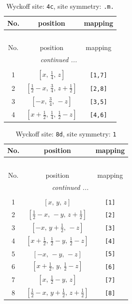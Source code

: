 \documentclass[fleqn,8pt]{jsarticle}
\begin{document}
\renewcommand{\arraystretch}{1.2}
\begin{longtable}{ccc}
\caption{Wyckoff site: {\tt 4c}, site symmetry: {\tt .m.}}
 \\
 \hline \hline
No. & position & mapping \\ \hline \endfirsthead

\multicolumn{2}{l}{\tablename\ \thetable{}} \\
 \hline \hline
No. & position & mapping \\ \hline \endhead

 \hline \hline
\multicolumn{2}{r}{\footnotesize\it continued ...} \\ \endfoot

 \hline \hline
\multicolumn{2}{r}{} \\ \endlastfoot

1 & $\left[ x,\, \frac{1}{4},\, z \right]$ & {\tt [1,7]} \\ \hline
2 & $\left[ \frac{1}{2} - x,\, \frac{3}{4},\, z + \frac{1}{2} \right]$ & {\tt [2,8]} \\ \hline
3 & $\left[ - x,\, \frac{3}{4},\, - z \right]$ & {\tt [3,5]} \\ \hline
4 & $\left[ x + \frac{1}{2},\, \frac{1}{4},\, \frac{1}{2} - z \right]$ & {\tt [4,6]} \\
\end{longtable}
\renewcommand{\arraystretch}{1.2}
\begin{longtable}{ccc}
\caption{Wyckoff site: {\tt 8d}, site symmetry: {\tt 1}}
 \\
 \hline \hline
No. & position & mapping \\ \hline \endfirsthead

\multicolumn{2}{l}{\tablename\ \thetable{}} \\
 \hline \hline
No. & position & mapping \\ \hline \endhead

 \hline \hline
\multicolumn{2}{r}{\footnotesize\it continued ...} \\ \endfoot

 \hline \hline
\multicolumn{2}{r}{} \\ \endlastfoot

1 & $\left[ x,\, y,\, z \right]$ & {\tt [1]} \\ \hline
2 & $\left[ \frac{1}{2} - x,\, - y,\, z + \frac{1}{2} \right]$ & {\tt [2]} \\ \hline
3 & $\left[ - x,\, y + \frac{1}{2},\, - z \right]$ & {\tt [3]} \\ \hline
4 & $\left[ x + \frac{1}{2},\, \frac{1}{2} - y,\, \frac{1}{2} - z \right]$ & {\tt [4]} \\ \hline
5 & $\left[ - x,\, - y,\, - z \right]$ & {\tt [5]} \\ \hline
6 & $\left[ x + \frac{1}{2},\, y,\, \frac{1}{2} - z \right]$ & {\tt [6]} \\ \hline
7 & $\left[ x,\, \frac{1}{2} - y,\, z \right]$ & {\tt [7]} \\ \hline
8 & $\left[ \frac{1}{2} - x,\, y + \frac{1}{2},\, z + \frac{1}{2} \right]$ & {\tt [8]} \\
\end{longtable}
\end{document}
